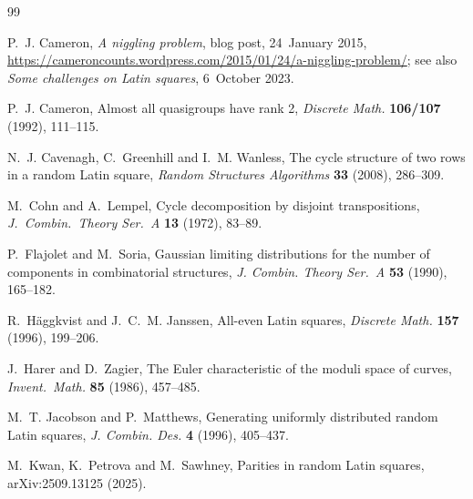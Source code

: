 \documentclass[11pt]{article}
\theoremstyle{definition}
\begin{document}
\begin{thebibliography}{99}

 P.~J. Cameron, \emph{A niggling problem}, blog post,
24~January 2015,
\url{https://cameroncounts.wordpress.com/2015/01/24/a-niggling-problem/};
see also \emph{Some challenges on Latin squares}, 6~October 2023.

 P.~J. Cameron, Almost all quasigroups have rank 2,
\emph{Discrete Math.} \textbf{106/107} (1992), 111--115.

 N.~J. Cavenagh, C.~Greenhill and I.~M. Wanless, The cycle
structure of two rows in a random Latin square, \emph{Random Structures
Algorithms} \textbf{33} (2008), 286--309.

 M.~Cohn and A.~Lempel, Cycle decomposition by disjoint
transpositions, \emph{J.\ Combin.\ Theory Ser.\ A} \textbf{13} (1972),
83--89.

 P.~Flajolet and M.~Soria, Gaussian limiting distributions for
the number of components in combinatorial structures, \emph{J. Combin.
Theory Ser.~A} \textbf{53} (1990), 165--182.

 R.~H\"aggkvist and J.~C.~M. Janssen, All-even Latin squares,
\emph{Discrete Math.} \textbf{157} (1996), 199--206.

 J.~Harer and D.~Zagier, The Euler characteristic of the
moduli space of curves, \emph{Invent.\ Math.} \textbf{85} (1986),
457--485.

 M.~T. Jacobson and P.~Matthews, Generating uniformly
distributed random Latin squares, \emph{J. Combin. Des.} \textbf{4} (1996),
405--437.

 M.~Kwan, K.~Petrova and M.~Sawhney, Parities in random Latin
squares, arXiv:2509.13125 (2025).


\end{thebibliography}
\end{document}

